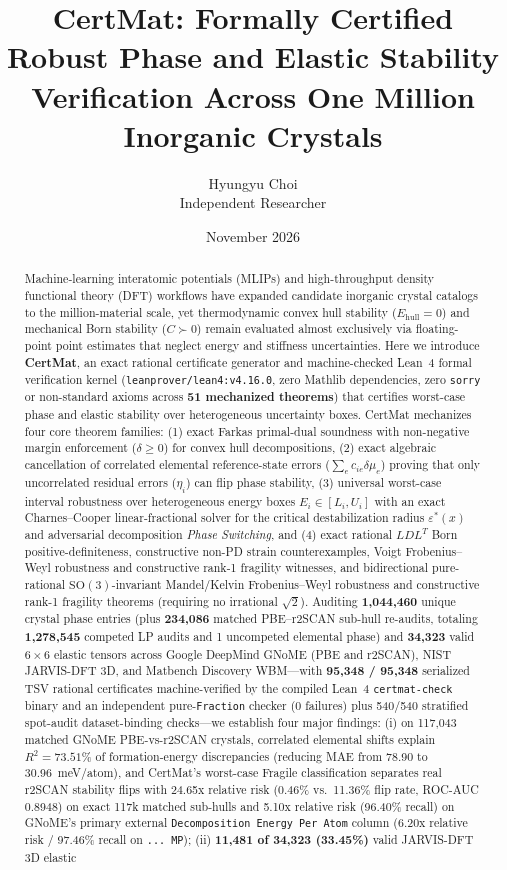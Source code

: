 \documentclass[11pt,a4paper]{article}
\title{\textbf{CertMat: Formally Certified Robust Phase and Elastic Stability Verification Across One Million Inorganic Crystals}}
\author{Hyungyu Choi \\ \small Independent Researcher}
\date{November 2026}
\newcommand{\br}{\allowbreak{}}
\begin{document}
\maketitle

\begin{abstract}
Machine-learning interatomic potentials (MLIPs) and high-throughput density functional theory (DFT) workflows have expanded candidate inorganic crystal catalogs to the million-material scale, yet thermodynamic convex hull stability ($E_{\mathrm{hull}} = 0$) and mechanical Born stability ($C \succ 0$) remain evaluated almost exclusively via floating-point point estimates that neglect energy and stiffness uncertainties. Here we introduce \textbf{CertMat}, an exact rational certificate generator and machine-checked Lean~4 formal verification kernel (\texttt{leanprover/\br{}lean4:v4.16.0}, zero Mathlib dependencies, zero \texttt{sorry} or non-standard axioms across \textbf{51 mechanized theorems}) that certifies worst-case phase and elastic stability over heterogeneous uncertainty boxes. CertMat mechanizes four core theorem families: (1) exact Farkas primal-dual soundness with non-negative margin enforcement ($\delta \ge 0$) for convex hull decompositions, (2) exact algebraic cancellation of correlated elemental reference-state errors ($\sum_e c_{ie}\delta\mu_e$) proving that only uncorrelated residual errors ($\eta_i$) can flip phase stability, (3) universal worst-case interval robustness over heterogeneous energy boxes $E_i \in [L_i, U_i]$ with an exact Charnes--Cooper linear-fractional solver for the critical destabilization radius $\varepsilon^*(x)$ and adversarial decomposition \emph{Phase Switching}, and (4) exact rational $LDL^T$ Born positive-definiteness, constructive non-PD strain counterexamples, Voigt Frobenius--Weyl robustness and constructive rank-1 fragility witnesses, and bidirectional pure-rational $\mathrm{SO}(3)$-invariant Mandel/Kelvin Frobenius--Weyl robustness and constructive rank-1 fragility theorems (requiring no irrational $\sqrt{2}$). Auditing \textbf{1,044,460} unique crystal phase entries (plus \textbf{234,086} matched PBE--r2SCAN sub-hull re-audits, totaling \textbf{1,278,545} competed LP audits and 1 uncompeted elemental phase) and \textbf{34,323} valid $6\times 6$ elastic tensors across Google DeepMind GNoME (PBE and r2SCAN), NIST JARVIS-DFT 3D, and Matbench Discovery WBM---with \textbf{95,348 / 95,348} serialized TSV rational certificates machine-verified by the compiled Lean~4 \texttt{certmat-check} binary and an independent pure-\texttt{Fraction} checker (0 failures) plus 540/540 stratified spot-audit dataset-binding checks---we establish four major findings: (i) on 117,043 matched GNoME PBE-vs-r2SCAN crystals, correlated elemental shifts explain $R^2 = 73.51\%$ of formation-energy discrepancies (reducing MAE from 78.90 to 30.96~meV/atom), and CertMat's worst-case Fragile classification separates real r2SCAN stability flips with 24.65x relative risk (0.46\% vs.\ 11.36\% flip rate, ROC-AUC 0.8948) on exact 117k matched sub-hulls and 5.10x relative risk (96.40\% recall) on GNoME's primary external \texttt{Decomposition Energy Per Atom} column (6.20x relative risk / 97.46\% recall on \texttt{... MP}); (ii) \textbf{11,481 of 34,323 (33.45\%)} valid JARVIS-DFT 3D elastic 
\end{abstract}
\end{document}
